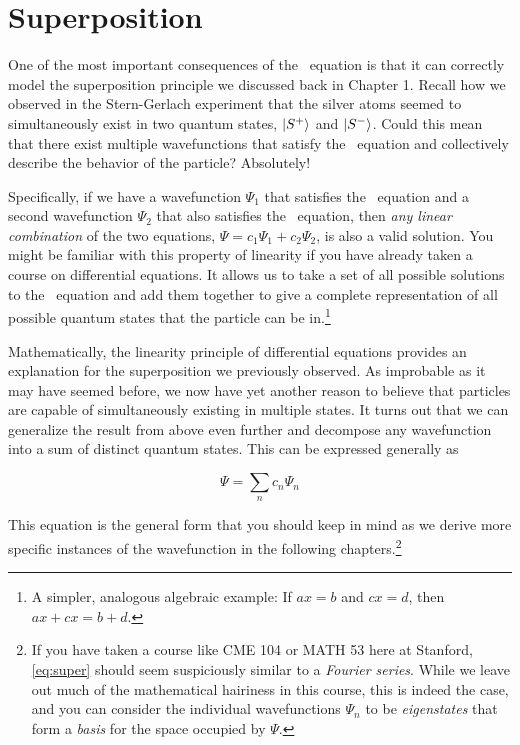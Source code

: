 \section{Superposition} \label{sec:super}

One of the most important consequences of the \Sch\ equation is that it can correctly model the superposition principle we discussed back in Chapter 1. 
Recall how we observed in the Stern-Gerlach experiment that the silver atoms seemed to simultaneously exist in two quantum states, $\ket{S^+}$ and $\ket{S^-}$. 
Could this mean that there exist multiple wavefunctions that satisfy the \Sch\ equation and collectively describe the behavior of the particle? 
Absolutely! 

Specifically, if we have a wavefunction $\Psi_1$ that satisfies the \Sch\ equation and a second wavefunction $\Psi_2$ that also satisfies the \Sch\ equation, then \emph{any linear combination} of the two equations, $\Psi = c_1\Psi_1 + c_2\Psi_2$, is also a valid solution. 
You might be familiar with this property of linearity if you have already taken a course on differential equations. 
It allows us to take a set of all possible solutions to the \Sch\ equation and add them together to give a complete representation of all possible quantum states that the particle can be in.\footnote{A simpler, analogous algebraic example: If $ax = b$ and $cx = d$, then $ax + cx = b + d$.}

Mathematically, the linearity principle of differential equations provides an explanation for the superposition we previously observed. 
As improbable as it may have seemed before, we now have yet another reason to believe that particles are capable of simultaneously existing in multiple states. 
It turns out that we can generalize the result from above even further and decompose any wavefunction into a sum of distinct quantum states. 
This can be expressed generally as

\begin{tcolorbox}[title=Superposition of wavefunctions] \vspace{-2ex}
	\begin{equation}
		\Psi = \sum_n c_n\Psi_n  \label{eq:super}
	\end{equation}
\end{tcolorbox}

This equation is the general form that you should keep in mind as we derive more specific instances of the wavefunction in the following chapters.\footnote{If you have taken a course like CME 104 or MATH 53 here at Stanford, \autoref{eq:super} should seem suspiciously similar to a \emph{Fourier series}. While we leave out much of the mathematical hairiness in this course, this is indeed the case, and you can consider the individual wavefunctions $\Psi_n$ to be \emph{eigenstates} that form a \emph{basis} for the space occupied by $\Psi$.}


